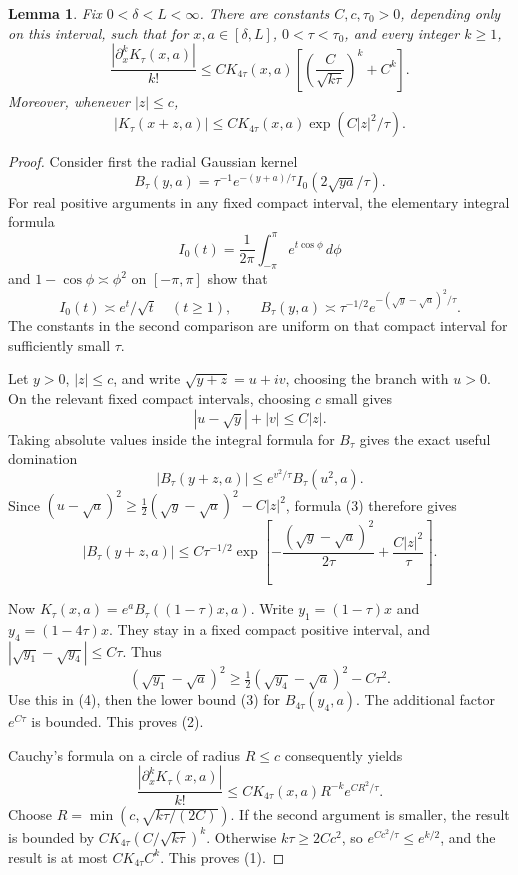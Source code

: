 \documentclass[11pt]{article}
\newtheorem{lemma}{Lemma}
\begin{document}
\begin{lemma}\label{derivatives}
Fix $0<\delta<L<\infty$. There are constants $C,c,\tau_0>0$,
depending only on this interval, such that for $x,a\in[\delta,L]$,
$0<\tau<\tau_0$, and every integer $k\ge1$,
\[
 \frac{|\partial_x^k K_\tau(x,a)|}{k!}
 \le C K_{4\tau}(x,a)
 \left[\left(\frac C{\sqrt{k\tau}}\right)^k+C^k\right].       \tag{1}
\]
Moreover, whenever $|z|\le c$,
\[
 |K_\tau(x+z,a)|\le C K_{4\tau}(x,a)
                              \exp(C|z|^2/\tau).             \tag{2}
\]
\end{lemma}
\begin{proof}
Consider first the radial Gaussian kernel
\[
 B_\tau(y,a)=\tau^{-1}e^{-(y+a)/\tau}
                             I_0(2\sqrt{ya}/\tau).
\]
For real positive arguments in any fixed compact interval,
the elementary integral formula
\[
 I_0(t)=\frac1{2\pi}\int_{-\pi}^{\pi}e^{t\cos\phi}\,d\phi
\]
and $1-\cos\phi\asymp\phi^2$ on $[-\pi,\pi]$ show that
\[
 I_0(t)\asymp e^t/\sqrt t\quad(t\ge1),\qquad
 B_\tau(y,a)\asymp\tau^{-1/2}
                   e^{-(\sqrt y-\sqrt a)^2/\tau}.          \tag{3}
\]
The constants in the second comparison are uniform on that compact
interval for sufficiently small $\tau$.

Let $y>0$, $|z|\le c$, and write $\sqrt{y+z}=u+iv$, choosing the
branch with $u>0$. On the relevant fixed compact intervals, choosing
$c$ small gives
\[
 |u-\sqrt y|+|v|\le C|z|.
\]
Taking absolute values inside the integral formula for $B_\tau$ gives
the exact useful domination
\[
 |B_\tau(y+z,a)|\le e^{v^2/\tau}B_\tau(u^2,a).
\]
Since
$(u-\sqrt a)^2\ge\tfrac12(\sqrt y-\sqrt a)^2-C|z|^2$,
formula (3) therefore gives
\[
 |B_\tau(y+z,a)|\le C\tau^{-1/2}
 \exp\!\left[-\frac{(\sqrt y-\sqrt a)^2}{2\tau}
                       +\frac{C|z|^2}\tau\right].         \tag{4}
\]

Now $K_\tau(x,a)=e^a B_\tau((1-\tau)x,a)$.
Write $y_1=(1-\tau)x$ and $y_4=(1-4\tau)x$.
They stay in a fixed compact positive interval, and
$|\sqrt{y_1}-\sqrt{y_4}|\le C\tau$. Thus
\[
 (\sqrt{y_1}-\sqrt a)^2
 \ge\tfrac12(\sqrt{y_4}-\sqrt a)^2-C\tau^2.
\]
Use this in (4), then the lower bound (3) for $B_{4\tau}(y_4,a)$.
The additional factor $e^{C\tau}$ is bounded. This proves (2).

Cauchy's formula on a circle of radius $R\le c$ consequently yields
\[
 \frac{|\partial_x^kK_\tau(x,a)|}{k!}
 \le C K_{4\tau}(x,a)R^{-k}e^{CR^2/\tau}.
\]
Choose $R=\min(c,\sqrt{k\tau/(2C)})$.
If the second argument is smaller, the result is bounded by
$C K_{4\tau}(C/\sqrt{k\tau})^k$.
Otherwise $k\tau\ge2Cc^2$, so $e^{Cc^2/\tau}\le e^{k/2}$,
and the result is at most $C K_{4\tau}C^k$.
This proves (1).
\end{proof}
\end{document}
